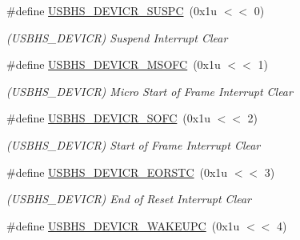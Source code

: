 \begin{DoxyCompactItemize}
\mbox{\label{group__SAME70__USBHS_ga9e2ea299b3e4a3f7ec15edbd5def56d9}} 
\#define \mbox{\hyperlink{group__SAME70__USBHS_ga9e2ea299b3e4a3f7ec15edbd5def56d9}{U\+S\+B\+H\+S\+\_\+\+D\+E\+V\+I\+C\+R\+\_\+\+S\+U\+S\+PC}}~(0x1u $<$$<$ 0)
\begin{DoxyCompactList}\small\item\em (U\+S\+B\+H\+S\+\_\+\+D\+E\+V\+I\+CR) Suspend Interrupt Clear \end{DoxyCompactList}\item 
\mbox{\label{group__SAME70__USBHS_ga2486ae0dbcb8cd35efc0aa238a766d4f}} 
\#define \mbox{\hyperlink{group__SAME70__USBHS_ga2486ae0dbcb8cd35efc0aa238a766d4f}{U\+S\+B\+H\+S\+\_\+\+D\+E\+V\+I\+C\+R\+\_\+\+M\+S\+O\+FC}}~(0x1u $<$$<$ 1)
\begin{DoxyCompactList}\small\item\em (U\+S\+B\+H\+S\+\_\+\+D\+E\+V\+I\+CR) Micro Start of Frame Interrupt Clear \end{DoxyCompactList}\item 
\mbox{\label{group__SAME70__USBHS_gaffa039519be07398014a73c69f85f5ba}} 
\#define \mbox{\hyperlink{group__SAME70__USBHS_gaffa039519be07398014a73c69f85f5ba}{U\+S\+B\+H\+S\+\_\+\+D\+E\+V\+I\+C\+R\+\_\+\+S\+O\+FC}}~(0x1u $<$$<$ 2)
\begin{DoxyCompactList}\small\item\em (U\+S\+B\+H\+S\+\_\+\+D\+E\+V\+I\+CR) Start of Frame Interrupt Clear \end{DoxyCompactList}\item 
\mbox{\label{group__SAME70__USBHS_ga74ab01c2fc258f8624d8ef2258a234a6}} 
\#define \mbox{\hyperlink{group__SAME70__USBHS_ga74ab01c2fc258f8624d8ef2258a234a6}{U\+S\+B\+H\+S\+\_\+\+D\+E\+V\+I\+C\+R\+\_\+\+E\+O\+R\+S\+TC}}~(0x1u $<$$<$ 3)
\begin{DoxyCompactList}\small\item\em (U\+S\+B\+H\+S\+\_\+\+D\+E\+V\+I\+CR) End of Reset Interrupt Clear \end{DoxyCompactList}\item 
\mbox{\label{group__SAME70__USBHS_ga8fecdd7991b62569cb29696878645573}} 
\#define \mbox{\hyperlink{group__SAME70__USBHS_ga8fecdd7991b62569cb29696878645573}{U\+S\+B\+H\+S\+\_\+\+D\+E\+V\+I\+C\+R\+\_\+\+W\+A\+K\+E\+U\+PC}}~(0x1u $<$$<$ 4)
$$
\end{DoxyCompactItemize}
